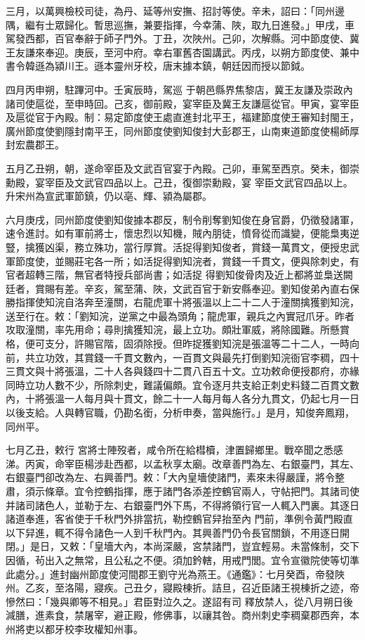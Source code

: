 \begin{pinyinscope}
 三月，以萬興檢校司徒，為丹、延等州安撫、招討等使。辛未，詔曰：「同州邊隅，繼有士眾歸化。暫思巡撫，兼要指揮，今幸蒲、陜，取九日進發。」甲戌，車駕發西都，百官奉辭于師子門外。丁丑，次陜州。己卯，次解縣。河中節度使、冀王友謙來奉迎。庚辰，至河中府。幸右軍舊杏園講武。丙戌，以朔方節度使、兼中書令韓遜為潁川王。遜本靈州牙校，唐末據本鎮，朝廷因而授以節鉞。



 四月丙申朔，駐蹕河中。壬寅辰時，駕巡
 于朝邑縣界焦黎店，冀王友謙及崇政內諸司使扈從，至申時回。己亥，御前殿，宴宰臣及冀王友謙扈從官。甲寅，宴宰臣及扈從官于內殿。制：易定節度使王處直進封北平王，福建節度使王審知封閩王，廣州節度使劉隱封南平王，同州節度使劉知俊封大彭郡王，山南東道節度使楊師厚封宏農郡王。



 五月乙丑朔，朝，遂命宰臣及文武百官宴于內殿。己卯，車駕至西京。癸未，御崇勳殿，宴宰臣及文武官四品以上。己丑，復御崇勳殿，宴
 宰臣文武官四品以上。升宋州為宣武軍節鎮，仍以亳、輝、潁為屬郡。



 六月庚戌，同州節度使劉知俊據本郡反，制令削奪劉知俊在身官爵，仍徵發諸軍，速令進討。如有軍前將士，懷忠烈以知機，賊內朋徒，憤脅從而識變，便能梟夷逆豎，擒獲凶渠，務立殊功，當行厚賞。活捉得劉知俊者，賞錢一萬貫文，便授忠武軍節度使，並賜莊宅各一所；如活捉得劉知浣者，賞錢一千貫文，便與除刺史，有官者超轉三階，無官者特授兵部尚書；如活捉
 得劉知俊骨肉及近上都將並梟送闕廷者，賞賜有差。辛亥，駕至蒲、陜，文武百官于新安縣奉迎。劉知俊弟內直右保勝指揮使知浣自洛奔至潼關，右龍虎軍十將張溫以上二十二人于潼關擒獲劉知浣，送至行在。敕：「劉知浣，逆黨之中最為頭角；龍虎軍，親兵之內實冠爪牙。昨者攻取潼關，率先用命；尋則擒獲知浣，最上立功。頗壯軍威，將除國難。所懸賞格，便可支分，許賜官階，固須除授。但昨捉獲劉知浣是張溫等二十二人，一時向
 前，共立功效，其賞錢一千貫文數內，一百貫文與最先打倒劉知浣衙官李稠，四十三貫文與十將張溫，二十人各與錢四十二貫八百五十文。立功敕命便授郡府，亦緣同時立功人數不少，所除刺史，難議偏頗。宜令逐月共支給正刺史料錢二百貫文數內，十將張溫一人每月與十貫文，餘二十一人每月每人各分九貫文，仍起七月一日以後支給。人與轉官職，仍勘名銜，分析申奏，當與施行。」是月，知俊奔鳳翔，同州平。



 七月乙丑，敕行
 宮將士陣歿者，咸令所在給槥櫝，津置歸鄉里。戰卒聞之悉感涕。丙寅，命宰臣楊涉赴西都，以孟秋享太廟。改章善門為左、右銀臺門，其左、右銀臺門卻改為左、右興善門。敕：「大內皇墻使諸門，素來未得嚴謹，將令整肅，須示條章。宜令控鶴指揮，應于諸門各添差控鶴官兩人，守帖把門。其諸司使并諸司諸色人，並勒于左、右銀臺門外下馬，不得將領行官一人輒入門裏。其逐日諸道奉進，客省使于千秋門外排當抗，勒控鶴官舁抬至內
 門前，準例令黃門殿直以下舁進，輒不得令諸色一人到千秋門內。其興善門仍令長官關鎖，不用逐日開閉。」是日，又敕：「皇墻大內，本尚深嚴，宮禁諸門，豈宜輕易。未當條制，交下因循，茍出入之無常，且公私之不便。須加鈐轄，用戒門閭。宜令宣徽院使等切準此處分。」進封幽州節度使河間郡王劉守光為燕王。《通鑑》：七月癸酉，帝發陜州。乙亥，至洛陽，寢疾。己丑夕，寢殿棟折。詰旦，召近臣諸王視棟折之迹，帝慘然曰：「幾與卿等不相見。」君臣對泣久之。遂詔有司
 釋放禁人，從八月朔日後減膳，進素食，禁屠宰，避正殿，修佛事，以禳其咎。商州刺史李稠棄郡西奔，本州將吏以都牙校李玫權知州事。




\end{pinyinscope}

